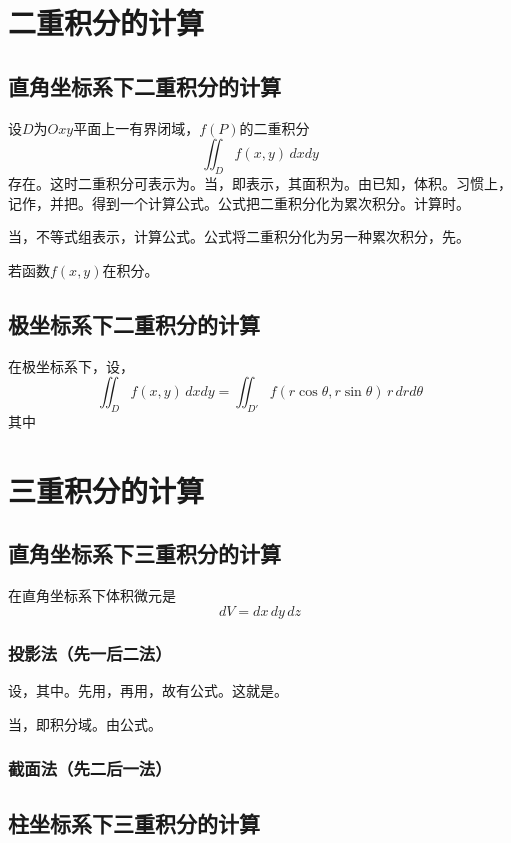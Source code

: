 \section{二重积分的计算}
\subsection{直角坐标系下二重积分的计算}

设$D$为$Oxy$平面上一有界闭域，$f(P)$的二重积分
\[
\iint_D f(x,y)\,dxdy
\]
存在。这时二重积分可表示为。当，即表示，其面积为。由已知，体积。习惯上，记作，并把。得到一个计算公式。公式把二重积分化为累次积分。计算时。

当，不等式组表示，计算公式。公式将二重积分化为另一种累次积分，先。

若函数$f(x,y)$在积分。

\subsection{极坐标系下二重积分的计算}

在极坐标系下，设，
\[
\iint_D f(x,y)\,dxdy=\iint_{D'} f(r\cos\theta,r\sin\theta)\,r\,dr d\theta
\]
其中

\section{三重积分的计算}
\subsection{直角坐标系下三重积分的计算}

在直角坐标系下体积微元是
\[
dV=dx\,dy\,dz
\]

\subsubsection{投影法（先一后二法）}

设，其中。先用，再用，故有公式。这就是。

当，即积分域。由公式。

\subsubsection{截面法（先二后一法）}

\subsection{柱坐标系下三重积分的计算}

